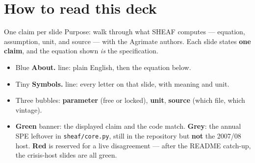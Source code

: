 \section*{How to read this deck}

\begin{frame}{One claim per slide}
Purpose: walk through what SHEAF computes --- equation, assumption,
unit, and source --- with the Agrimate authors. Each slide states
\textbf{one claim}, and the equation shown \emph{is} the specification.

\begin{itemize}
\item Blue \textbf{About.} line: plain English, then the equation below.
\item Tiny \textbf{Symbols.} line: every letter on that slide, with
      meaning and unit.
\item Three bubbles: \textbf{parameter} (free or locked), \textbf{unit},
      \textbf{source} (which file, which vintage).
\item \textbf{Green} banner: the displayed claim and the code match.
      \textbf{Grey}: the annual SPE leftover in \texttt{sheaf/core.py},
      still in the repository but \textbf{not} the 2007/08 host.
      \textbf{Red} is reserved for a live disagreement --- after the
      README catch-up, the crisis-host slides are all green.
\end{itemize}
\end{frame}

